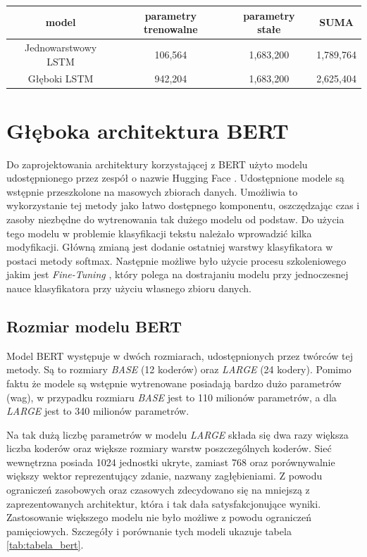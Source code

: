 \begin{table}[t]
\label{tab:tabela_modele}
\centering\footnotesize%
\begin{tabular}{c c c c}
\toprule
model & parametry trenowalne & parametry stałe & SUMA \\
\midrule
Jednowarstwowy LSTM   & 106,564 & 1,683,200 & 1,789,764 \\
Głęboki LSTM   & 942,204 & 1,683,200 & 2,625,404 \\
\bottomrule
\end{tabular}
\end{table}

\section{Głęboka architektura BERT}

Do zaprojektowania architektury korzystającej z BERT użyto modelu udostępnionego przez zespół o nazwie Hugging Face \cite{wolf2019huggingfaces}. Udostępnione modele są wstępnie przeszkolone na masowych zbiorach danych. Umożliwia to wykorzystanie tej metody jako łatwo dostępnego komponentu, oszczędzając czas i zasoby niezbędne do wytrenowania tak dużego modelu od podstaw. Do użycia tego modelu w problemie klasyfikacji tekstu należało wprowadzić kilka modyfikacji. Główną zmianą jest dodanie ostatniej warstwy klasyfikatora w postaci metody softmax. Następnie możliwe było użycie procesu szkoleniowego jakim jest \textit{Fine-Tuning} \cite{sun2019finetune}, który polega na dostrajaniu modelu przy jednoczesnej nauce klasyfikatora przy użyciu własnego zbioru danych. 

\subsection{Rozmiar modelu BERT}

Model BERT występuje w dwóch rozmiarach, udostępnionych przez twórców tej metody. Są to rozmiary \textit{BASE} (12 koderów) oraz \textit{LARGE} (24 kodery). Pomimo faktu że modele są wstępnie wytrenowane posiadają bardzo dużo parametrów (wag), w przypadku rozmiaru \textit{BASE} jest to 110 milionów parametrów, a dla \textit{LARGE} jest to 340 milionów parametrów.

Na tak dużą liczbę parametrów w modelu \textit{LARGE} składa się dwa razy większa liczba koderów oraz większe rozmiary warstw poszczególnych koderów. Sieć wewnętrzna posiada 1024 jednostki ukryte, zamiast 768 oraz porównywalnie większy wektor reprezentujący zdanie, nazwany zagłębieniami. Z powodu ograniczeń zasobowych oraz czasowych zdecydowano się na mniejszą z zaprezentowanych architektur, która i tak dała satysfakcjonujące wyniki. Zastosowanie większego modelu nie było możliwe z powodu ograniczeń pamięciowych. Szczegóły i porównanie tych modeli ukazuje tabela \ref{tab:tabela_bert}.

